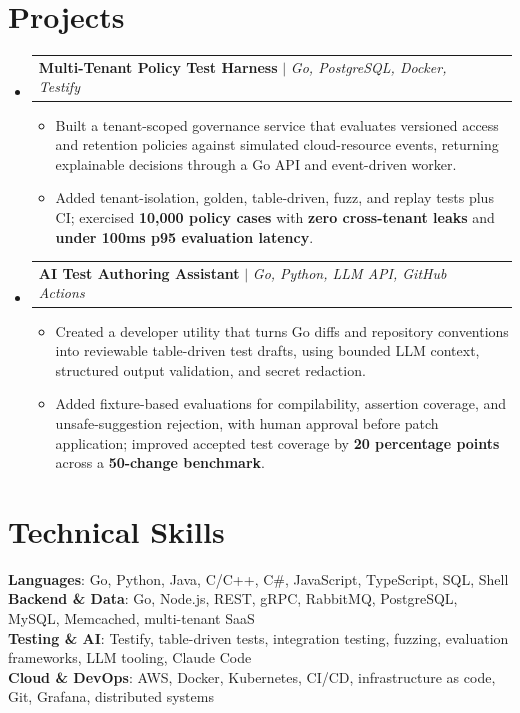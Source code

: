 \documentclass[letterpaper,11pt]{article}
\makeatletter
\newcommand{\resumeItem}[1]{
  \item\small{
    {#1 \vspace{-2pt}}
  }
}
\newcommand{\resumeProjectHeading}[2]{
    \item
    \begin{tabular*}{0.97\textwidth}{l@{\extracolsep{\fill}}r}
      \small#1 & #2 \\
    \end{tabular*}\vspace{-7pt}
}
\newcommand{\resumeSubHeadingListStart}{\begin{itemize}[leftmargin=0.15in, label={}]}
\newcommand{\resumeSubHeadingListEnd}{\end{itemize}}
\newcommand{\resumeItemListStart}{\begin{itemize}}
\newcommand{\resumeItemListEnd}{\end{itemize}\vspace{-5pt}}
\makeatother
\begin{document}
\section{Projects}
\resumeSubHeadingListStart
\resumeProjectHeading
{\textbf{Multi-Tenant Policy Test Harness} $|$ \emph{Go, PostgreSQL, Docker, Testify}}{}
\resumeItemListStart
\resumeItem{Built a tenant-scoped governance service that evaluates versioned access and retention policies against simulated cloud-resource events, returning explainable decisions through a Go API and event-driven worker.}
\resumeItem{Added tenant-isolation, golden, table-driven, fuzz, and replay tests plus CI; exercised \textbf{10,000 policy cases} with \textbf{zero cross-tenant leaks} and \textbf{under 100ms p95 evaluation latency}.}
\resumeItemListEnd
\resumeProjectHeading
{\textbf{AI Test Authoring Assistant} $|$ \emph{Go, Python, LLM API, GitHub Actions}}{}
\resumeItemListStart
\resumeItem{Created a developer utility that turns Go diffs and repository conventions into reviewable table-driven test drafts, using bounded LLM context, structured output validation, and secret redaction.}
\resumeItem{Added fixture-based evaluations for compilability, assertion coverage, and unsafe-suggestion rejection, with human approval before patch application; improved accepted test coverage by \textbf{20 percentage points} across a \textbf{50-change benchmark}.}
\resumeItemListEnd
\resumeSubHeadingListEnd


\section{Technical Skills}
\begin{itemize}[leftmargin=0.15in, label={}]
  \small{\item{
        \textbf{Languages}{: Go, Python, Java, C/C++, C\#, JavaScript, TypeScript, SQL, Shell} \\
        \textbf{Backend \& Data}{: Go, Node.js, REST, gRPC, RabbitMQ, PostgreSQL, MySQL, Memcached, multi-tenant SaaS} \\
        \textbf{Testing \& AI}{: Testify, table-driven tests, integration testing, fuzzing, evaluation frameworks, LLM tooling, Claude Code} \\
        \textbf{Cloud \& DevOps}{: AWS, Docker, Kubernetes, CI/CD, infrastructure as code, Git, Grafana, distributed systems}
        }}
\end{itemize}


\end{document}

